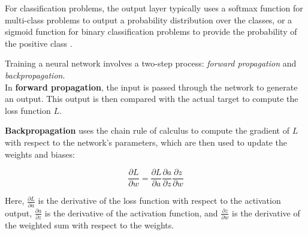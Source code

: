 \begin{figure}[h!]
	\centering
	
	\centering
	
\end{figure}


For classification problems, the output layer typically uses a softmax function for multi-class problems to output a probability distribution over the classes, or a sigmoid function for binary classification problems to provide the probability of the positive class \cite{goodfellow2016deep}.




Training a neural network involves a two-step process: \textit{forward propagation} and \textit{backpropagation}. \\

In \textbf{forward propagation}, the input is passed through the network to generate an output. This output is then compared with the actual target to compute the loss function $ L $.

\textbf{Backpropagation} uses the chain rule of calculus to compute the gradient of $ L $ with respect to the network's parameters, which are then used to update the weights and biases:

\[
\frac{\partial L}{\partial w} = \frac{\partial L}{\partial a} \frac{\partial a}{\partial z} \frac{\partial z}{\partial w}
\]

Here, $ \frac{\partial L}{\partial a} $ is the derivative of the loss function with respect to the activation output, $ \frac{\partial a}{\partial z} $ is the derivative of the activation function, and $ \frac{\partial z}{\partial w} $ is the derivative of the weighted sum with respect to the weights.

